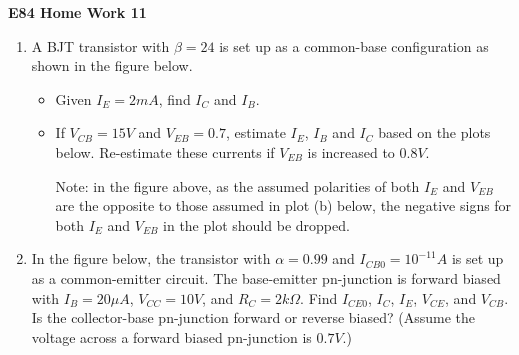 \usepackage{html}

\begin{center}
{\Large \bf  E84 Home Work 11}
\end{center}

\begin{enumerate}

\item A BJT transistor with $\beta=24$ is set up as a common-base 
configuration as shown in the figure below. 

\begin{itemize} 
\item Given $I_E=2 mA$, find $I_C$ and $I_B$.
\item If $V_{CB}=15V$ and $V_{EB}=0.7$, estimate $I_E$, $I_B$ and $I_C$ 
  based on the plots below. Re-estimate these currents if $V_{EB}$ is 
  increased to $0.8V$.

  Note: in the figure above, as the assumed polarities of both $I_E$ and 
  $V_{EB}$ are the opposite to those assumed in plot (b) below, the negative
  signs for both $I_E$ and $V_{EB}$ in the plot should be dropped.

\end{itemize}


% 

\item In the figure below, the transistor with $\alpha=0.99$ and
  $I_{CB0}=10^{-11} A$ is set up as a common-emitter circuit. The
  base-emitter pn-junction is forward biased with $I_B=20 \mu A$, 
  $V_{CC}=10V$, and $R_C=2k\Omega$. Find $I_{CE0}$, $I_C$, $I_E$, 
  $V_{CE}$, and $V_{CB}$. Is the collector-base pn-junction forward
  or reverse biased? (Assume the voltage across a forward biased 
  pn-junction is $0.7 V$.)
  



\end{enumerate}
